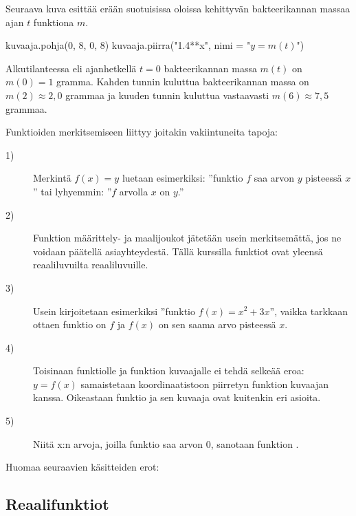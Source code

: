 \begin{esimerkki}
Seuraava kuva esittää erään suotuisissa oloissa kehittyvän bakteerikannan massaa ajan $t$ funktiona $m$.

\begin{kuva}
    kuvaaja.pohja(0, 8, 0, 8)
    kuvaaja.piirra("1.4**x", nimi = "$y=m(t)$")
\end{kuva}

Alkutilanteessa eli ajanhetkellä $t=0$ bakteerikannan massa $m(t)$ on $m(0)=1$ gramma. Kahden tunnin kuluttua bakteerikannan massa on $m(2)\approx 2,0$ grammaa ja kuuden tunnin kuluttua vastaavasti $m(6)\approx 7,5$ grammaa. 
\end{esimerkki}

Funktioiden merkitsemiseen liittyy joitakin vakiintuneita tapoja:
\begin{description}
	\item[1)] Merkintä $f(x) = y$ luetaan esimerkiksi: ''funktio $f$ saa arvon $y$ pisteessä $x$'' tai lyhyemmin: ''$f$ arvolla $x$ on $y$.''
	\item[2)] Funktion määrittely- ja maalijoukot jätetään usein merkitsemättä, jos ne voidaan päätellä asiayhteydestä.
		Tällä kurssilla funktiot ovat yleensä reaaliluvuilta reaaliluvuille.
	\item[3)] Usein kirjoitetaan esimerkiksi ''funktio $f(x) = x^2+3x$'', vaikka tarkkaan ottaen funktio on $f$ ja
		$f(x)$ on sen saama arvo pisteessä $x$.
	\item[4)] Toisinaan funktiolle ja funktion kuvaajalle ei tehdä selkeää eroa:
		$y = f(x)$ samaistetaan koordinaatistoon piirretyn funktion kuvaajan kanssa.
		Oikeastaan funktio ja sen kuvaaja ovat kuitenkin eri asioita.
	\item[5)] Niitä x:n arvoja, joilla funktio saa arvon 0, sanotaan funktion .
\end{description}

Huomaa seuraavien käsitteiden erot:

\subsection*{Reaalifunktiot}

